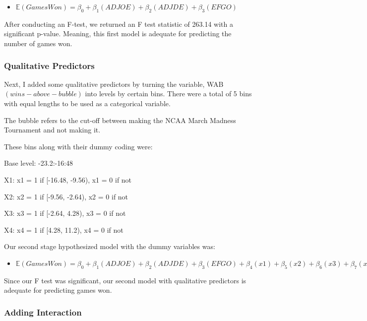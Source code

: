 \documentclass{article}
\begin{document}
\begin{itemize}

  \item $\mathbb{E}(Games Won) = \beta_{0} + \beta_{1}(ADJOE) + \beta_{2}(ADJDE) + \beta_{3}(EFGO)$ 
  
\end{itemize}


After conducting an F-test, we returned an F test statistic of 263.14 with a significant p-value. Meaning, this first model is adequate for predicting the number of games won. 

\subsubsection*{Qualitative Predictors}

Next, I added some qualitative predictors by turning the variable, WAB $(wins-above-bubble)$ into levels by certain bins. There were a total of 5 bins with equal lengths to be used as a categorical variable.

The bubble refers to the cut-off between making the NCAA March Madness Tournament and not making it. 

These bins along with their dummy coding were:

Base level: -23.2:-16:48

X1: x1 = 1 if [-16.48, -9.56), x1 = 0 if not

X2: x2 = 1 if [-9.56, -2.64), x2 = 0 if not

X3: x3 = 1 if [-2.64, 4.28), x3 = 0 if not

X4: x4 = 1 if [4.28, 11.2), x4 = 0 if not

Our second stage hypothesized model with the dummy variables was:

\begin{itemize}

  \item $\mathbb{E}(Games Won) = \beta_{0} + \beta_{1}(ADJOE) + \beta_{2}(ADJDE) + \beta_{3}(EFGO) + \beta_{4}(x1) + \beta_{5}(x2) + \beta_{6}(x3) + \beta_{7}(x4)$ 
  
\end{itemize}

Since our F test was significant, our second model with qualitative predictors is adequate for predicting games won. 

\subsubsection*{Adding Interaction}
\end{document}
